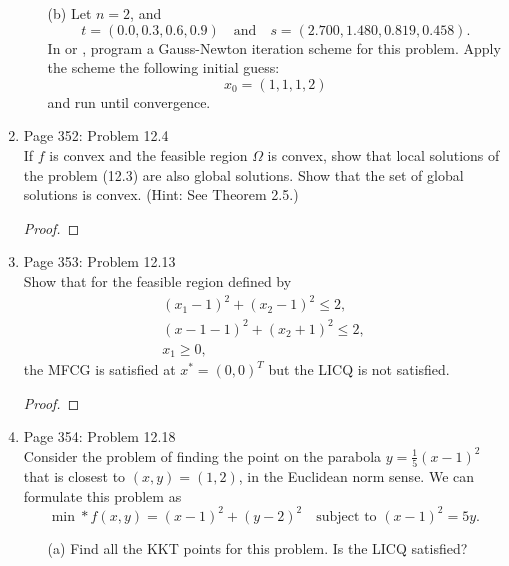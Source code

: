 \documentclass[11pt, oneside]{article}
\begin{document}
\begin{enumerate}
\begin{enumerate}
      \item[(b)]
        Let $n = 2$, and
        \[
          t = (0.0, 0.3, 0.6, 0.9) \quad \text{and} \quad s = (2.700, 1.480, 0.819, 0.458).
        \]
        In \MATLAB or \PYTHON, program a Gauss-Newton iteration scheme for this
        problem.
        Apply the scheme the following initial guess:
        \[
          x_0 = (1, 1, 1, 2)
        \]
        and run until convergence.


    \end{enumerate}

  \item %
    Page 352: Problem 12.4 \\
    If $f$ is convex and the feasible region $\Omega$ is convex, show that local
    solutions of the problem (12.3) are also global solutions.
    Show that the set of global solutions is convex.
    (Hint: See Theorem 2.5.)

    \begin{proof}
      
    \end{proof}

  \item %
    Page 353: Problem 12.13 \\
    Show that for the feasible region defined by
    \begin{align*}
      (x_1 - 1)^2 + (x_2 - 1)^2 \le 2, \\
      (x-1 - 1)^2 + (x_2 + 1)^2 \le 2, \\
      x_1 \ge 0,
    \end{align*}
    the MFCG is satisfied at $x^* = (0, 0)^T$ but the LICQ is not satisfied.

    \begin{proof}
      
    \end{proof}

  \item %
    Page 354: Problem 12.18 \\
    Consider the problem of finding the point on the parabola
    $y = \frac{1}{5}(x - 1)^2$ that is closest to $(x, y) = (1, 2)$, in the
    Euclidean norm sense.
    We can formulate this problem as
    \[
      \min*{f(x, y)} = (x - 1)^2 + (y - 2)^2 \quad \text{subject to } (x - 1)^2 = 5y.
    \]
    \begin{enumerate}
      \item[(a)]
        Find all the KKT points for this problem.
        Is the LICQ satisfied?


\end{enumerate}
\end{enumerate}
\end{document}
